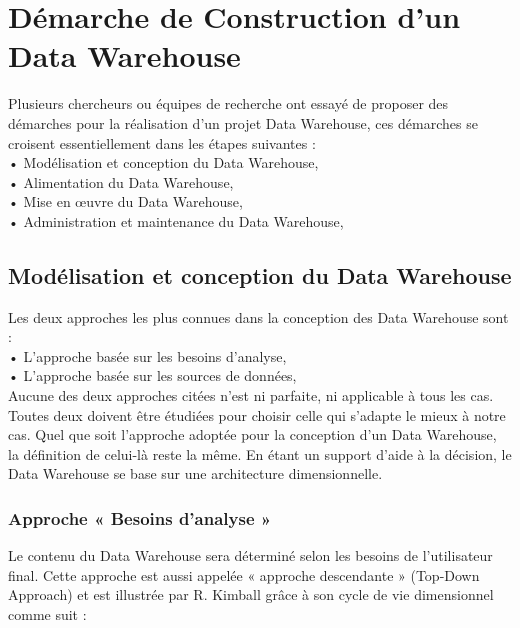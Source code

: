    
   
\section{Démarche de Construction d’un Data Warehouse}   
   Plusieurs chercheurs ou équipes de recherche ont essayé de proposer des démarches pour la réalisation d’un projet Data Warehouse, ces démarches se croisent essentiellement dans les étapes suivantes :\\
•	Modélisation et conception du Data Warehouse,\\
•	Alimentation du Data Warehouse,\\
•	Mise en œuvre du Data Warehouse,\\
•	Administration et maintenance du Data Warehouse,\\

\subsection{Modélisation et conception du Data Warehouse}

Les deux approches les plus connues dans la conception des Data Warehouse sont :\\
•	L’approche basée sur les besoins d’analyse,\\
•	L’approche basée sur les sources de données,\\
Aucune des deux approches citées n’est ni parfaite, ni applicable à tous les cas. Toutes deux doivent être étudiées pour choisir celle qui s’adapte le mieux à notre cas. Quel que soit l’approche adoptée pour la conception d’un Data Warehouse, la définition de celui-là reste la même. En étant un support d’aide à la décision, le Data Warehouse se base sur une architecture dimensionnelle.


 \subsubsection{Approche « Besoins d’analyse »}
 
  Le contenu du Data Warehouse sera déterminé selon les besoins de l’utilisateur final. Cette approche est aussi appelée « approche descendante » (Top-Down Approach) et est illustrée par R. Kimball grâce à son cycle de vie dimensionnel comme suit :
  
